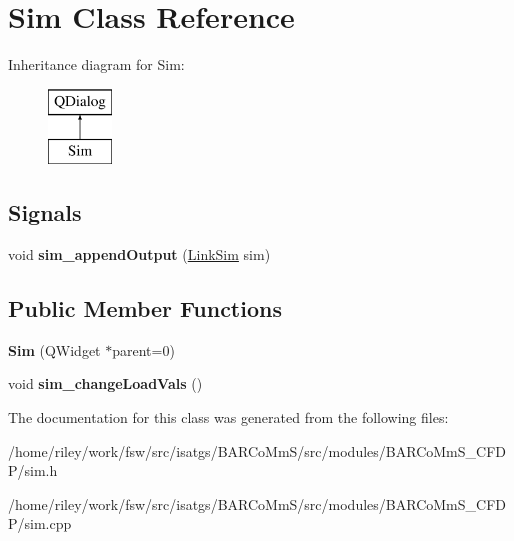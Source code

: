 \hypertarget{class_sim}{}\section{Sim Class Reference}
\label{class_sim}
Inheritance diagram for Sim\+:\begin{figure}[H]
\begin{center}
\leavevmode
\includegraphics[height=2.000000cm]{class_sim}
\end{center}
\end{figure}
\subsection*{Signals}
\begin{DoxyCompactItemize}
\item 
void {\bfseries sim\+\_\+append\+Output} (\hyperlink{struct_link_sim}{Link\+Sim} sim)\hypertarget{class_sim_afc12f2f23c51332f4feaa7b5e0ea461f}{}\label{class_sim_afc12f2f23c51332f4feaa7b5e0ea461f}

\end{DoxyCompactItemize}
\subsection*{Public Member Functions}
\begin{DoxyCompactItemize}
\item 
{\bfseries Sim} (Q\+Widget $\ast$parent=0)\hypertarget{class_sim_ae84d420452fc950c0a0bfe523e1c030d}{}\label{class_sim_ae84d420452fc950c0a0bfe523e1c030d}

\item 
void {\bfseries sim\+\_\+change\+Load\+Vals} ()\hypertarget{class_sim_a8a8d0fa162b1eb548a0c97055d1ea124}{}\label{class_sim_a8a8d0fa162b1eb548a0c97055d1ea124}

\end{DoxyCompactItemize}


The documentation for this class was generated from the following files\+:\begin{DoxyCompactItemize}
\item 
/home/riley/work/fsw/src/isatgs/\+B\+A\+R\+Co\+Mm\+S/src/modules/\+B\+A\+R\+Co\+Mm\+S\+\_\+\+C\+F\+D\+P/sim.\+h\item 
/home/riley/work/fsw/src/isatgs/\+B\+A\+R\+Co\+Mm\+S/src/modules/\+B\+A\+R\+Co\+Mm\+S\+\_\+\+C\+F\+D\+P/sim.\+cpp\end{DoxyCompactItemize}
